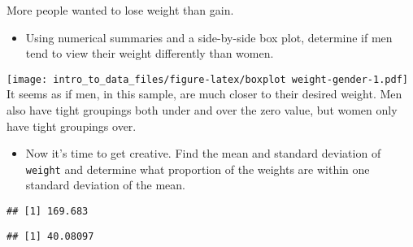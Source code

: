 \documentclass[]{article}
\newenvironment{Shaded}{\begin{snugshade}}{\end{snugshade}}
\newcommand{\KeywordTok}[1]{\textcolor[rgb]{0.13,0.29,0.53}{\textbf{#1}}}
\newcommand{\StringTok}[1]{\textcolor[rgb]{0.31,0.60,0.02}{#1}}
\newcommand{\OperatorTok}[1]{\textcolor[rgb]{0.81,0.36,0.00}{\textbf{#1}}}
\newcommand{\NormalTok}[1]{#1}
\providecommand{\tightlist}{%
  \setlength{\itemsep}{0pt}\setlength{\parskip}{0pt}}
\begin{document}
More people wanted to lose weight than gain.

\begin{itemize}
\tightlist
\item
  Using numerical summaries and a side-by-side box plot, determine if
  men tend to view their weight differently than women.
\end{itemize}

\begin{Shaded}
\end{Shaded}

\texttt{[image: intro\_to\_data\_files/figure-latex/boxplot weight-gender-1.pdf]}
It seems as if men, in this sample, are much closer to their desired
weight. Men also have tight groupings both under and over the zero
value, but women only have tight groupings over.

\begin{itemize}
\tightlist
\item
  Now it's time to get creative. Find the mean and standard deviation of
  \texttt{weight} and determine what proportion of the weights are
  within one standard deviation of the mean.
\end{itemize}

\begin{Shaded}
\end{Shaded}

\begin{verbatim}
## [1] 169.683
\end{verbatim}

\begin{Shaded}
\end{Shaded}

\begin{verbatim}
## [1] 40.08097
\end{verbatim}
\end{document}
